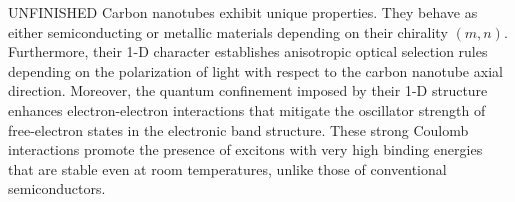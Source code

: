 {\color{red} UNFINISHED} Carbon nanotubes exhibit unique properties. They behave as either semiconducting or metallic materials depending on their chirality $(m,n)$. Furthermore, their 1-D character establishes anisotropic optical selection rules depending on the polarization of light with respect to the carbon nanotube axial direction. Moreover, the quantum confinement imposed by their 1-D structure enhances electron-electron interactions that mitigate the oscillator strength of free-electron states in the electronic band structure. These strong Coulomb interactions promote the presence of excitons with very high binding energies that are stable even at room temperatures, unlike those of conventional semiconductors.
